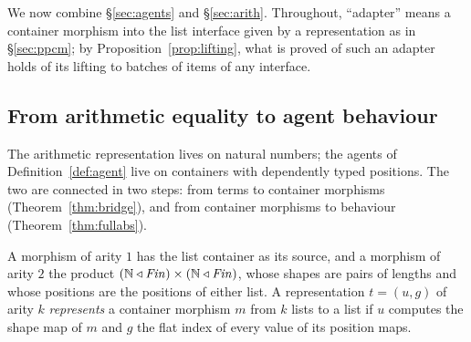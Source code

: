 \documentclass{fundam}
\begin{document}
We now combine \S\ref{sec:agents} and \S\ref{sec:arith}.  Throughout, ``adapter'' means
a container morphism into the list interface given by a representation as in
\S\ref{sec:ppcm}; by Proposition~\ref{prop:lifting}, what is proved of such an adapter
holds of its lifting to batches of items of any interface.

\subsection{From arithmetic equality to agent behaviour}\label{sec:bridge}

The arithmetic representation lives on natural numbers; the agents of
Definition~\ref{def:agent} live on containers with dependently typed positions.  The
two are connected in two steps: from terms to container morphisms
(Theorem~\ref{thm:bridge}), and from container morphisms to behaviour
(Theorem~\ref{thm:fullabs}).

A morphism of arity $1$ has the list container as its source, and a morphism of arity $2$
the product $(\mathbb{N} \triangleleft \mathit{Fin}) \times (\mathbb{N} \triangleleft \mathit{Fin})$, whose shapes are
pairs of lengths and whose positions are the positions of either list.  A representation
$t = (u, g)$ of arity $k$ \emph{represents} a container morphism $m$ from $k$ lists to a
list if $u$ computes the shape map of $m$ and $g$ the flat index of every value of its
position maps.
\end{document}
